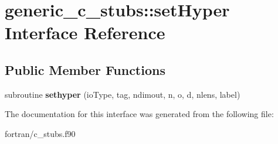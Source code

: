 \hypertarget{interfacegeneric__c__stubs_1_1set_hyper}{}\section{generic\+\_\+c\+\_\+stubs\+:\+:set\+Hyper Interface Reference}
\label{interfacegeneric__c__stubs_1_1set_hyper}
\subsection*{Public Member Functions}
\begin{DoxyCompactItemize}
\item 
\mbox{\label{interfacegeneric__c__stubs_1_1set_hyper_a921d0f67cd38dede641b86300b890aa1}} 
subroutine {\bfseries sethyper} (io\+Type, tag, ndimout, n, o, d, nlens, label)
\end{DoxyCompactItemize}


The documentation for this interface was generated from the following file\+:\begin{DoxyCompactItemize}
\item 
fortran/c\+\_\+stubs.\+f90\end{DoxyCompactItemize}
